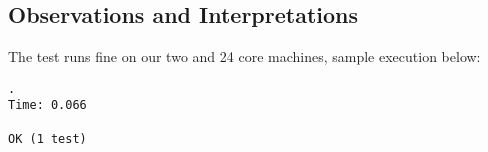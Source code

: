 \subsection{Observations and Interpretations}

The test runs fine on our two and 24 core machines, sample execution below: \\

\begin{verbatim}
.
Time: 0.066

OK (1 test)
\end{verbatim}
\hfill

